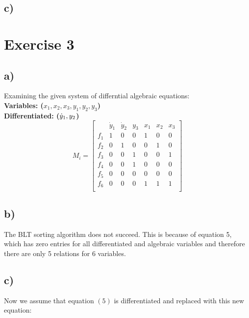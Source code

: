 \documentclass[10pt]{article}
\begin{document}
\subsection*{c)}





\section*{Exercise 3}

\subsection*{a)}

Examining the given system of differntial algebraic equations: \\
\textbf{Variables: ($x_1, x_2, x_3, y_1, y_2, y_3$)}\\
\textbf{Differentiated: ($\dot y_1, \do y_2$)}\\

\[
M_i = 
\left[
\begin{array}{c|cccccc}
   & \dot y_1  & \dot y_2 & y_3 & x_1  & x_2 & x_3 \\ \hline 
f_1 &  1 & 0 & 0 & 1 & 0 & 0 \\
f_2 &  0 & 1 & 0 & 0 & 1 & 0 \\
f_3 &  0 & 0 & 1 & 0 & 0 & 1 \\
f_4 &  0 & 0 & 1 & 0 & 0 & 0 \\
f_5 &  0 & 0 & 0 & 0 & 0 & 0 \\
f_6 &  0 & 0 & 0 & 1 & 1 & 1 \\
\end{array}
\right]
\]


\subsection*{b)}

The BLT sorting algorithm does not succeed.  This is because of equation 5, which has zero entries for all differentiated and algebraic variables and therefore there are only 5 relations for 6 variables.

\subsection*{c)}

Now we assume that equation $(5)$ is differentiated and replaced with this new equation: \\
\end{document}
